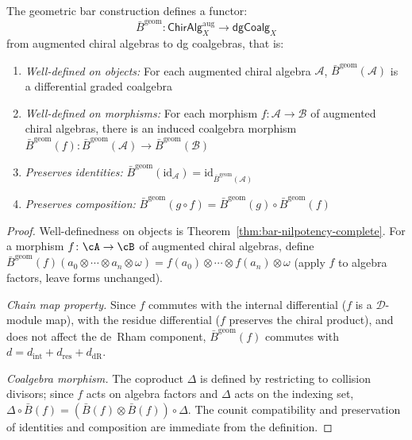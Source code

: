 \begin{theorem}\label{thm:bar-functorial-complete}
\label{thm:bar-functorial}
The geometric bar construction defines a functor:
\[\bar{B}^{\text{geom}}: \mathsf{ChirAlg}_X^{\mathrm{aug}} \to \mathsf{dgCoalg}_X\]
from augmented chiral algebras to dg coalgebras, that is:
\begin{enumerate}
\item \emph{Well-defined on objects:} For each augmented chiral algebra $\mathcal{A}$, $\bar{B}^{\text{geom}}(\mathcal{A})$ is a differential graded coalgebra
\item \emph{Well-defined on morphisms:} For each morphism $f: \mathcal{A} \to \mathcal{B}$ of augmented chiral algebras, there is an induced coalgebra morphism $\bar{B}^{\text{geom}}(f): \bar{B}^{\text{geom}}(\mathcal{A}) \to \bar{B}^{\text{geom}}(\mathcal{B})$
\item \emph{Preserves identities:} $\bar{B}^{\text{geom}}(\text{id}_\mathcal{A}) = \text{id}_{\bar{B}^{\text{geom}}(\mathcal{A})}$
\item \emph{Preserves composition:} $\bar{B}^{\text{geom}}(g \circ f) = \bar{B}^{\text{geom}}(g) \circ \bar{B}^{\text{geom}}(f)$
\end{enumerate}
\end{theorem}

\begin{proof}
Well-definedness on objects is
Theorem~\ref{thm:bar-nilpotency-complete}.
For a morphism $f\colon \cA \to \cB$ of augmented chiral
algebras, define
$\bar{B}^{\mathrm{geom}}(f)(a_0 \otimes \cdots \otimes a_n
\otimes \omega) = f(a_0) \otimes \cdots \otimes f(a_n) \otimes
\omega$\label{thm:bar-induced-map}
(apply $f$ to algebra factors, leave forms unchanged).

\emph{Chain map property.}\label{thm:bar-induced-chain-map}
Since $f$ commutes with the internal differential ($f$ is a
$\mathcal{D}$-module map), with the residue differential ($f$
preserves the chiral product), and does not affect the de~Rham
component, $\bar{B}^{\mathrm{geom}}(f)$ commutes with
$d = d_{\mathrm{int}} + d_{\mathrm{res}} + d_{\mathrm{dR}}$.

\emph{Coalgebra morphism.}\label{lem:bar-induced-coalgebra}
The coproduct $\Delta$ is defined by restricting to collision
divisors; since $f$ acts on algebra factors and $\Delta$ acts
on the indexing set,
$\Delta \circ \bar{B}(f) = (\bar{B}(f) \otimes \bar{B}(f))
\circ \Delta$. The counit compatibility and preservation of
identities and composition are immediate from the definition.
\end{proof}

